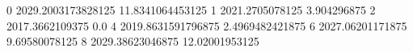 0 2029.2003173828125 11.8341064453125
1 2021.2705078125 3.904296875
2 2017.3662109375 0.0
4 2019.8631591796875 2.4969482421875
6 2027.06201171875 9.69580078125
8 2029.38623046875 12.02001953125
